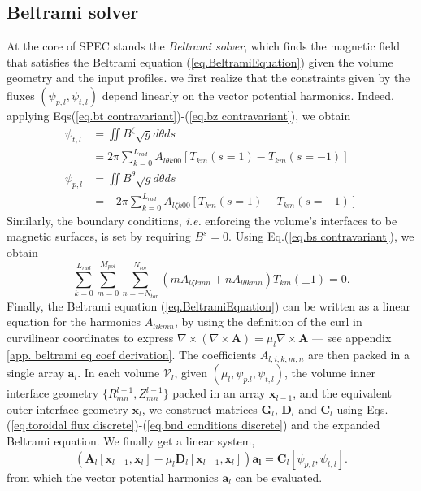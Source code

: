\documentclass[my_thesis.tex]{subfiles}
\begin{document}
\subsection{Beltrami solver} \label{spec beltrami solver}
At the core of SPEC stands the \emph{Beltrami solver}, which finds the magnetic field that satisfies the Beltrami equation (\ref{eq.BeltramiEquation}) given the volume geometry and the input profiles. we first realize that the constraints given by the fluxes $(\psi_{p,l},\psi_{t,l})$ depend linearly on the vector potential harmonics. Indeed, applying Eqs(\ref{eq.bt contravariant})-(\ref{eq.bz contravariant}), we obtain
\begin{align}
	\psi_{t,l} &= \iint B^\zeta \sqrt{g}d\theta ds\\
	&= 2\pi\sum_{k=0}^{L_{rad}} A_{l\theta k 0 0 } [T_{km}(s=1)-T_{km}(s=-1)] \label{eq.toroidal flux discrete}\\
	\psi_{p,l} &= \iint B^\theta \sqrt{g}d\theta ds\\
	&= -2\pi\sum_{k=0}^{L_{rad}} A_{l\zeta k 0 0 }[T_{km}(s=1)-T_{km}(s=-1)]
\end{align}
Similarly, the boundary conditions, \textit{i.e.} enforcing the volume's interfaces to be magnetic surfaces, is set by requiring $B^s=0$. Using Eq.(\ref{eq.bs contravariant}), we obtain
\begin{equation}
	\sum_{k=0}^{L_{rad}}\sum_{m=0}^{M_{pol}}\sum_{n=-N_{tor}}^{N_{tor}} (mA_{l\zeta k mn}+ n A_{l\theta k mn})T_{km}(\pm 1) = 0.\label{eq.bnd conditions discrete}
\end{equation}
Finally, the Beltrami equation (\ref{eq.BeltramiEquation}) can be written as a linear equation for the harmonics $A_{likmn}$, by using the definition of the curl in curvilinear coordinates to express $\nabla\times(\nabla\times\mathbf{A})=\mu_l\nabla\times\mathbf{A}$ --- see appendix \ref{app. beltrami eq coef derivation}. The coefficients $A_{l,i,k,m,n}$ are then packed in a single array $\mathbf{a}_l$. In each volume $\mathcal{V}_l$, given $(\mu_l,\psi_{p.l},\psi_{t,l})$, the volume inner interface geometry $\{R^{l-1}_{mn},Z^{l-1}_{mn}\}$ packed in an array $\mathbf{x}_{l-1}$, and the equivalent outer interface geometry $\mathbf{x}_l$, we construct matrices $\mathbf{G}_l$, $\mathbf{D}_l$ and $\mathbf{C}_l$ using Eqs.(\ref{eq.toroidal flux discrete})-(\ref{eq.bnd conditions discrete}) and the expanded Beltrami equation. We finally get a linear system,
\begin{equation}
	\left(\mathbf{A}_l[\mathbf{x}_{l-1},\mathbf{x}_l]-\mu_l\mathbf{D}_l[\mathbf{x}_{l-1},\mathbf{x}_l]\right)\mathbf{a_l} = \mathbf{C}_l[\psi_{p,l},\psi_{t,l}]. \label{eq.linearized_beltrami_system}
\end{equation}
from which the vector potential harmonics $\mathbf{a}_l$ can be evaluated.
\end{document}
